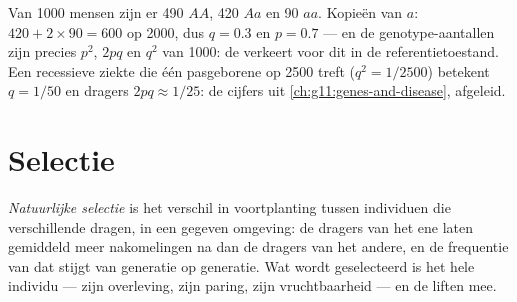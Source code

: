 \begin{example}\label{ex:g12:selection-drift-speciation:count}
Van 1000 mensen zijn er 490 $AA$, 420 $Aa$ en 90 $aa$. Kopieën van $a$:
$420 + 2 \times 90 = 600$ op 2000, dus $q = 0.3$ en $p = 0.7$ --- en de
genotype-aantallen zijn precies $p^2$, $2pq$ en $q^2$ van 1000: de
 verkeert voor dit  in de referentietoestand. Een recessieve
ziekte die één pasgeborene op 2500 treft ($q^2 = 1/2500$) betekent
$q = 1/50$ en dragers $2pq \approx 1/25$: de cijfers uit
\cref{ch:g11:genes-and-disease}, afgeleid.
\end{example}

\section{Selectie}

\begin{definition}\label{def:g12:selection-drift-speciation:selection}
\emph{Natuurlijke selectie} is het verschil
in voortplanting tussen individuen die verschillende  dragen, in
een gegeven omgeving: de dragers van het ene  laten gemiddeld meer
nakomelingen na dan de dragers van het andere, en de frequentie van dat
 stijgt van generatie op generatie. Wat wordt geselecteerd is het
hele individu --- zijn overleving, zijn paring, zijn vruchtbaarheid ---
en de  liften mee.
\end{definition}

